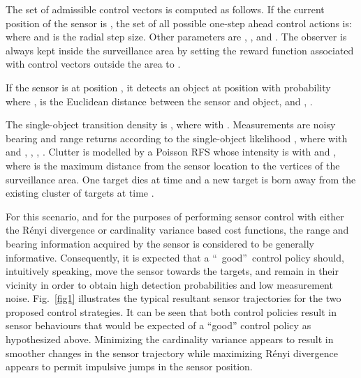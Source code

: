 \documentclass[twocolumn]{autart}
\begin{document}
The set of admissible control vectors  is computed as follows. If
the current position of the sensor is , the set of all
possible one-step ahead control actions is:
where  and  is the
radial step size. Other parameters are , , and . The observer is
always kept inside the surveillance area by setting the reward function
associated with control vectors outside the area to .

If the sensor is at position , it detects an object at position  with probability
where ,  is the Euclidean distance between the sensor and object, and , .

The single-object transition density is , where
with . Measurements are noisy bearing and range returns according to
the single-object likelihood , where  with
and , , , . Clutter is
modelled by a Poisson RFS whose intensity is  with  and , where 
is the maximum distance from the sensor location to the vertices of the
surveillance area. One target dies at time  and a new target is born away from the existing cluster of targets at time .

For this scenario, and for the purposes of performing sensor control with either the R\'{e}nyi divergence or cardinality variance based cost functions, the range
and bearing information acquired by the sensor is considered to be generally
informative. Consequently, it is expected that a \textquotedblleft\
good\textquotedblright\ control policy should, intuitively speaking, move
the sensor towards the targets, and remain in their vicinity in order to
obtain high detection probabilities and low measurement noise. Fig.~\ref{fig1} illustrates the
typical resultant sensor trajectories for the two proposed control
strategies. It can be seen that both control policies result in sensor behaviours that would be
expected of a ``good'' control policy as hypothesized above. Minimizing the cardinality variance appears to result in
smoother changes in the sensor trajectory while maximizing R\'{e}nyi divergence
appears to permit impulsive jumps in the sensor position.
\end{document}
